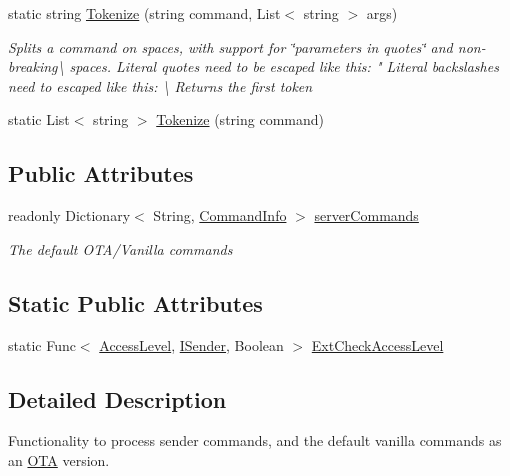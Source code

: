 \begin{DoxyCompactItemize}
static string \hyperlink{classOTA_1_1Command_1_1CommandParser_a41afa27c96dc7f46d4d48d5846873bcd}{Tokenize} (string command, List$<$ string $>$ args)
\begin{DoxyCompactList}\small\item\em Splits a command on spaces, with support for \char`\"{}parameters in quotes\char`\"{} and non-\/breaking\textbackslash{} spaces. Literal quotes need to be escaped like this\+: " Literal backslashes need to escaped like this\+: \textbackslash{} Returns the first token \end{DoxyCompactList}\item 
static List$<$ string $>$ \hyperlink{classOTA_1_1Command_1_1CommandParser_aed7a9badaa95f91a1a5c7110e5e87953}{Tokenize} (string command)
\end{DoxyCompactItemize}
\subsection*{Public Attributes}
\begin{DoxyCompactItemize}
\item 
readonly Dictionary$<$ String, \hyperlink{classOTA_1_1Command_1_1CommandInfo}{Command\+Info} $>$ \hyperlink{classOTA_1_1Command_1_1CommandParser_a6b1a0845c0af065839766e04cb403502}{server\+Commands}
\begin{DoxyCompactList}\small\item\em The default O\+T\+A/\+Vanilla commands \end{DoxyCompactList}\end{DoxyCompactItemize}
\subsection*{Static Public Attributes}
\begin{DoxyCompactItemize}
\item 
static Func$<$ \hyperlink{namespaceOTA_1_1Command_a0bb463ef02a9fd3406866a98c6fc2cdc}{Access\+Level}, \hyperlink{interfaceOTA_1_1Command_1_1ISender}{I\+Sender}, Boolean $>$ \hyperlink{classOTA_1_1Command_1_1CommandParser_ac15e5808dae73d018b83f64844aa130a}{Ext\+Check\+Access\+Level}
\end{DoxyCompactItemize}


\subsection{Detailed Description}
Functionality to process sender commands, and the default vanilla commands as an \hyperlink{namespaceOTA}{O\+T\+A} version. 



